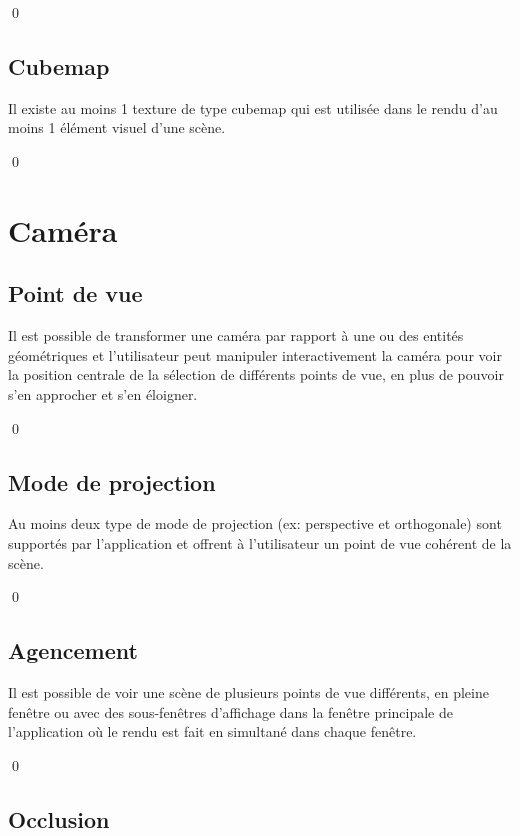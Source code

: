 \documentclass[12pt]{article}
\newcommand{\state}{\noindent}
\begin{document}
\qed

\subsection{Cubemap}

\state
Il existe au moins 1 texture de type cubemap qui est utilisée dans le rendu d'au moins 1 élément visuel d'une scène.

\qed

\pagebreak

\section{Caméra}

\subsection{Point de vue}

\state
Il est possible de transformer une caméra par rapport à une ou des entités géométriques et l'utilisateur peut manipuler interactivement la caméra pour voir la position centrale de la sélection de différents points de vue, en plus de pouvoir s'en approcher et s'en éloigner.

\qed

\subsection{Mode de projection}

\state
Au moins deux type de mode de projection (ex: perspective et orthogonale) sont supportés par l'application et offrent à l'utilisateur un point de vue cohérent de la scène.

\qed

\subsection{Agencement}

\state
Il est possible de voir une scène de plusieurs points de vue différents, en pleine fenêtre ou avec des sous-fenêtres d'affichage dans la fenêtre principale de l'application où le rendu est fait en simultané dans chaque fenêtre.

\qed

\subsection{Occlusion}
\end{document}
